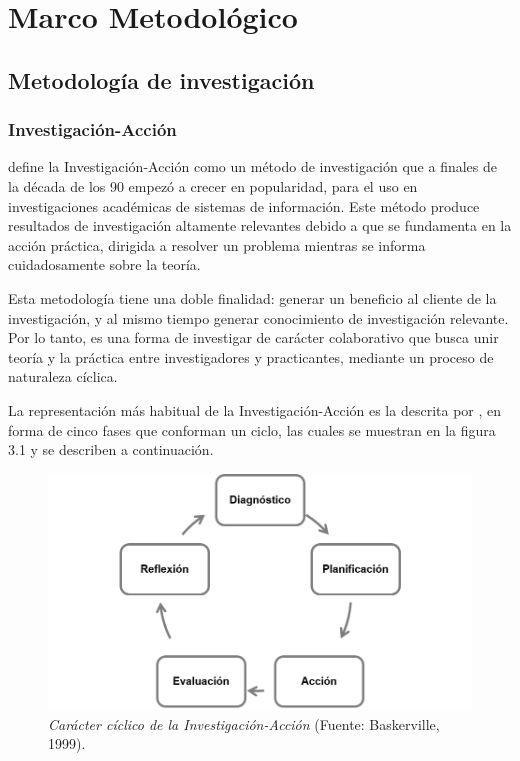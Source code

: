 \chapter{Marco Metodol\'{o}gico}
	
\capIII
	
	\section{Metodolog\'{i}a de investigaci\'{o}n}
	
		\subsection{Investigaci\'{o}n-Acci\'{o}n}
	\cite{Baskerville} define la Investigaci\'{o}n-Acci\'{o}n como un m\'{e}todo de investigaci\'{o}n que a finales de la d\'{e}cada de los 90 empez\'{o} a crecer en popularidad, para el uso en investigaciones acad\'{e}micas de sistemas de informaci\'{o}n. Este m\'{e}todo produce resultados de investigaci\'{o}n altamente relevantes debido a que se fundamenta en la acci\'{o}n pr\'{a}ctica, dirigida a resolver un problema mientras se informa cuidadosamente sobre la teor\'{i}a.

	Esta metodolog\'{i}a tiene una doble finalidad: generar un beneficio al cliente de la investigaci\'{o}n, y al mismo tiempo generar conocimiento de investigaci\'{o}n relevante. Por lo tanto, es una forma de investigar de car\'{a}cter colaborativo que busca unir teor\'{i}a y la pr\'{a}ctica entre investigadores y practicantes, mediante un proceso de naturaleza c\'{i}clica.

	La representaci\'{o}n m\'{a}s habitual de la Investigaci\'{o}n-Acci\'{o}n es la descrita por \cite{Baskerville}, en forma de cinco fases que conforman un ciclo, las cuales se muestran en la figura 3.1 y se describen a continuaci\'{o}n.

	\begin{figure}
		\centering
		\includegraphics[scale=0.8]{img/investigacion-accion.png}
			\caption[Car\'{a}cter c\'{i}clico de la Investigaci\'{o}n-Acci\'{o}n]{\textit{Car\'{a}cter c\'{i}clico de la Investigaci\'{o}n-Acci\'{o}n} (Fuente: Baskerville, 1999).}
	\end{figure}

